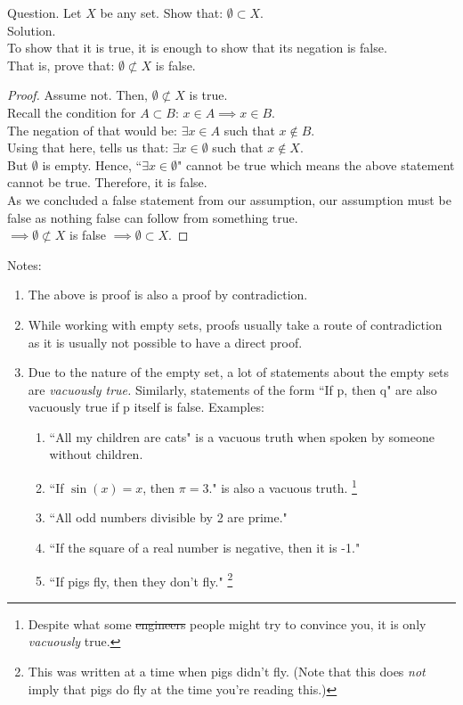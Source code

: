 \hrulefill


\hrulefill
\newpage
Question. Let $X$ be any set. Show that: $\emptyset \subset X$.\\
Solution.\\
To show that it is true, it is enough to show that its negation is false.\\
That is, prove that: $\emptyset \not\subset X$ is false.
\begin{proof}
Assume not. Then, $\emptyset \not\subset X$ is true.\\
Recall the condition for $A\subset B$: $x \in A \implies x \in B$.\\
The negation of that would be: $\exists x \in A$ such that $x \not\in B.$\\
Using that here, tells us that: $\exists x \in \emptyset$ such that $x \not\in X$.\\
But $\emptyset$ is empty. Hence, ``$\exists x \in \emptyset$" cannot be true which means the above statement cannot be true. Therefore, it is false.\\
As we concluded a false statement from our assumption, our assumption must be false as nothing false can follow from something true.\\
$\implies \emptyset \not\subset X$ is false $\implies \emptyset \subset X$.
\end{proof}

\dotfill

Notes:
\begin{enumerate}
    \item The above is proof is also a proof by contradiction.
    \item While working with empty sets, proofs usually take a route of contradiction as it is usually not possible to have a direct proof.
    \item Due to the nature of the empty set, a lot of statements about the empty sets are \textit{vacuously true.} Similarly, statements of the form ``If p, then q" are also vacuously true if p itself is false.
    Examples:
    \begin{enumerate}[nosep]
        \item ``All my children are cats" is a vacuous truth when spoken by someone without children.
        \item ``If $\sin(x)=x$, then $\pi = 3.$" is also a vacuous truth. \footnote{Despite what some \st{engineers} people might try to convince you, it is only \textit{vacuously} true.}
        \item ``All odd numbers divisible by 2 are prime."
        \item ``If the square of a real number is negative, then it is -1."
        \item ``If pigs fly, then they don't fly." \footnote{This was written at a time when pigs didn't fly. (Note that this does \textit{not} imply that pigs do fly at the time you're reading this.)}
    \end{enumerate}
\end{enumerate}

